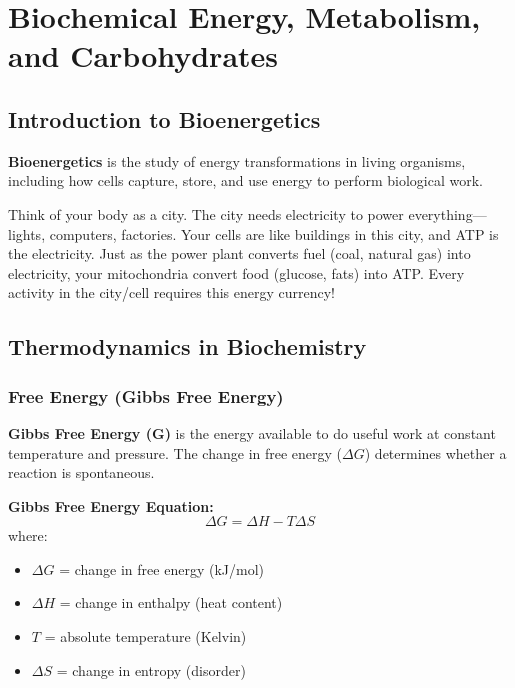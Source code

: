 \section{Biochemical Energy, Metabolism, and Carbohydrates}

\subsection{Introduction to Bioenergetics}

\begin{definition}
\textbf{Bioenergetics} is the study of energy transformations in living organisms, including how cells capture, store, and use energy to perform biological work.
\end{definition}

\begin{analogy}
Think of your body as a city. The city needs electricity to power everything—lights, computers, factories. Your cells are like buildings in this city, and ATP is the electricity. Just as the power plant converts fuel (coal, natural gas) into electricity, your mitochondria convert food (glucose, fats) into ATP. Every activity in the city/cell requires this energy currency!
\end{analogy}

\subsection{Thermodynamics in Biochemistry}

\subsubsection{Free Energy (Gibbs Free Energy)}

\begin{definition}
\textbf{Gibbs Free Energy (G)} is the energy available to do useful work at constant temperature and pressure. The change in free energy ($\Delta G$) determines whether a reaction is spontaneous.
\end{definition}

\begin{theorem}
\textbf{Gibbs Free Energy Equation:}
\[
\Delta G = \Delta H - T\Delta S
\]
where:
\begin{itemize}
    \item $\Delta G$ = change in free energy (kJ/mol)
    \item $\Delta H$ = change in enthalpy (heat content)
    \item $T$ = absolute temperature (Kelvin)
    \item $\Delta S$ = change in entropy (disorder)
\end{itemize}
\end{theorem}

